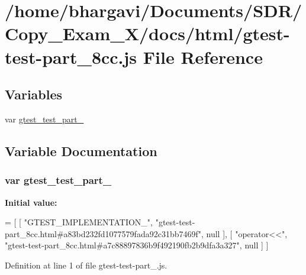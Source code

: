 \hypertarget{gtest-test-part__8cc_8js}{}\section{/home/bhargavi/\+Documents/\+S\+D\+R/\+Copy\+\_\+\+Exam\+\_\+X/docs/html/gtest-\/test-\/part\+\_\+8cc.js File Reference}
\label{gtest-test-part__8cc_8js}
\subsection*{Variables}
\begin{DoxyCompactItemize}
\item 
var \hyperlink{gtest-test-part__8cc_8js_afc2a453490fbb05f735a5cfd06cb1153}{gtest\+\_\+test\+\_\+part\+\_}
\end{DoxyCompactItemize}


\subsection{Variable Documentation}
\subsubsection[{\texorpdfstring{gtest\+\_\+test\+\_\+part\+\_\+8cc}{gtest_test_part_8cc}}]{\setlength{\rightskip}{0pt plus 5cm}var gtest\+\_\+test\+\_\+part\+\_}\hypertarget{gtest-test-part__8cc_8js_afc2a453490fbb05f735a5cfd06cb1153}{}\label{gtest-test-part__8cc_8js_afc2a453490fbb05f735a5cfd06cb1153}
{\bfseries Initial value\+:}
\begin{DoxyCode}
=
[
    [ \textcolor{stringliteral}{"GTEST\_IMPLEMENTATION\_"}, \textcolor{stringliteral}{"gtest-test-part\_8cc.html#a83bd232fd1077579fada92c31bb7469f"}, null ],
    [ \textcolor{stringliteral}{"operator<<"}, \textcolor{stringliteral}{"gtest-test-part\_8cc.html#a7c88897836b9f492190fb2b9dfa3a327"}, null ]
]
\end{DoxyCode}


Definition at line 1 of file gtest-\/test-\/part\+\_.\+js.

